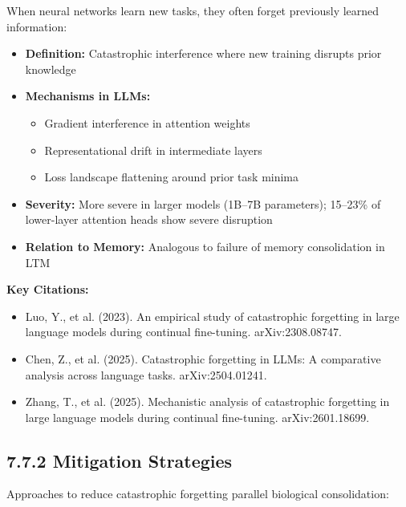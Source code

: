 \documentclass[11pt,letterpaper]{article}
\begin{document}
When neural networks learn new tasks, they often forget previously learned information:

\begin{itemize}[leftmargin=*]
    \item \textbf{Definition:} Catastrophic interference where new training disrupts prior knowledge
    \item \textbf{Mechanisms in LLMs:}
    \begin{itemize}
        \item Gradient interference in attention weights
        \item Representational drift in intermediate layers
        \item Loss landscape flattening around prior task minima
    \end{itemize}
    \item \textbf{Severity:} More severe in larger models (1B--7B parameters); 15--23\% of lower-layer attention heads show severe disruption
    \item \textbf{Relation to Memory:} Analogous to failure of memory consolidation in LTM
\end{itemize}

\textbf{Key Citations:}
\begin{itemize}[leftmargin=*]
    \item Luo, Y., et al. (2023). An empirical study of catastrophic forgetting in large language models during continual fine-tuning. arXiv:2308.08747.
    \item Chen, Z., et al. (2025). Catastrophic forgetting in LLMs: A comparative analysis across language tasks. arXiv:2504.01241.
    \item Zhang, T., et al. (2025). Mechanistic analysis of catastrophic forgetting in large language models during continual fine-tuning. arXiv:2601.18699.
\end{itemize}

\subsection{7.7.2 Mitigation Strategies}

Approaches to reduce catastrophic forgetting parallel biological consolidation:
\end{document}
